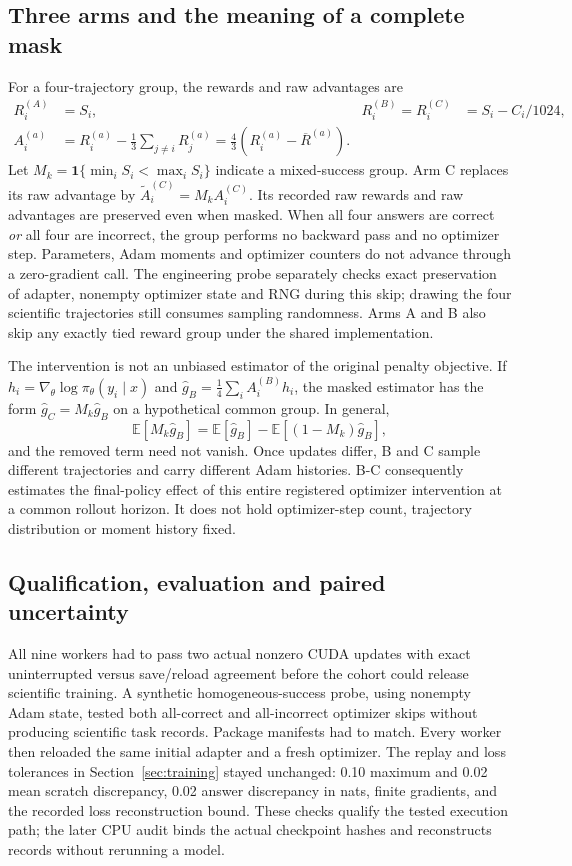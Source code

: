\documentclass[11pt]{article}
\newcommand{\E}{\mathbb{E}}
\begin{document}
\subsection{Three arms and the meaning of a complete mask}

For a four-trajectory group, the rewards and raw advantages are
\begin{align}
 R^{(A)}_i&=S_i,& R^{(B)}_i=R^{(C)}_i&=S_i-C_i/1024,\\
 A_i^{(a)}&=R_i^{(a)}-\frac13\sum_{j\ne i}R_j^{(a)}
            =\frac43(R_i^{(a)}-\overline R^{(a)}).
\end{align}
Let $M_k=\mathbf1\{\min_i S_i<\max_i S_i\}$ indicate a mixed-success group. Arm C replaces its raw advantage by $\widetilde A_i^{(C)}=M_kA_i^{(C)}$. Its recorded raw rewards and raw advantages are preserved even when masked. When all four answers are correct \emph{or} all four are incorrect, the group performs no backward pass and no optimizer step. Parameters, Adam moments and optimizer counters do not advance through a zero-gradient call. The engineering probe separately checks exact preservation of adapter, nonempty optimizer state and RNG during this skip; drawing the four scientific trajectories still consumes sampling randomness. Arms A and B also skip any exactly tied reward group under the shared implementation.

The intervention is not an unbiased estimator of the original penalty objective. If $h_i=\nabla_\theta\log\pi_\theta(y_i\mid x)$ and $\widehat g_B=\frac14\sum_i A_i^{(B)}h_i$, the masked estimator has the form $\widehat g_C=M_k\widehat g_B$ on a hypothetical common group. In general,
\begin{equation}
 \E[M_k\widehat g_B]=\E[\widehat g_B]-\E[(1-M_k)\widehat g_B],
\end{equation}
and the removed term need not vanish. Once updates differ, B and C sample different trajectories and carry different Adam histories. B-C consequently estimates the final-policy effect of this entire registered optimizer intervention at a common rollout horizon. It does not hold optimizer-step count, trajectory distribution or moment history fixed.

\subsection{Qualification, evaluation and paired uncertainty}

All nine workers had to pass two actual nonzero CUDA updates with exact uninterrupted versus save/reload agreement before the cohort could release scientific training. A synthetic homogeneous-success probe, using nonempty Adam state, tested both all-correct and all-incorrect optimizer skips without producing scientific task records. Package manifests had to match. Every worker then reloaded the same initial adapter and a fresh optimizer. The replay and loss tolerances in Section~\ref{sec:training} stayed unchanged: 0.10 maximum and 0.02 mean scratch discrepancy, 0.02 answer discrepancy in nats, finite gradients, and the recorded loss reconstruction bound. These checks qualify the tested execution path; the later CPU audit binds the actual checkpoint hashes and reconstructs records without rerunning a model.
\end{document}
